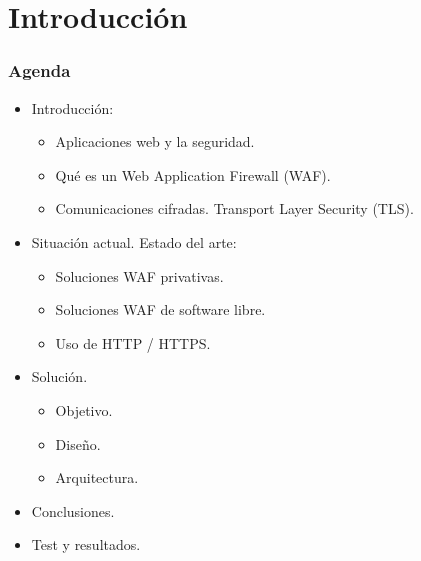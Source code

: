 \theoremstyle{remark} \newtheorem*{NICDomain}{NIC Domain}
\theoremstyle{remark} \newtheorem*{Site}{Site}
\theoremstyle{remark} \newtheorem*{IPDB}{Internet Protocol Databse (IPDB)}
\theoremstyle{remark} \newtheorem*{Node}{Node}
\theoremstyle{remark} \newtheorem*{DS}{Database Server (DS, D-SRV)}
\theoremstyle{remark} \newtheorem*{AS}{Application Server (AS, A-SRV)}
\theoremstyle{remark} \newtheorem*{LC}{Local Collector (LC)}
\theoremstyle{remark} \newtheorem*{RC}{Remote Collector (RC)}

\section{Introducción}
\begin{frame}[shrink]
  \frametitle{Agenda}
  \begin{itemize}
    \item Introducción:
      \begin{itemize}
        \item Aplicaciones web y la seguridad.
        \item Qué es un Web Application Firewall (WAF).
        \item Comunicaciones cifradas. Transport Layer Security (TLS).
      \end{itemize}
    \item Situación actual. Estado del arte:
      \begin{itemize}
        \item Soluciones WAF privativas.
        \item Soluciones WAF de software libre.
        \item Uso de HTTP / HTTPS.
      \end{itemize}
    \item Solución.
      \begin{itemize}
        \item Objetivo.
        \item Diseño.
        \item Arquitectura.
      \end{itemize}
    \item Conclusiones.
    \item Test y resultados.
  \end{itemize}
\end{frame}

